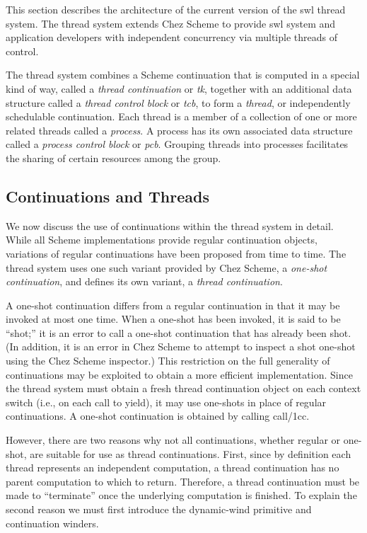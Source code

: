 \documentclass{article}
\begin{document}
This section describes the architecture of the current version of the
{\sc swl} thread system.  The thread system extends Chez Scheme to provide
{\sc swl} system and application developers with independent concurrency via
multiple threads of control. 

The thread system combines a Scheme continuation that is computed in a
special kind of way, called a {\em thread continuation\/} or {\em tk},
together with an additional data structure called a {\em thread
control block\/} or {\em tcb}, to form a {\em thread}, or
independently schedulable continuation.  Each thread is a member of a
collection of one or more related threads called a {\em process}. A
process has its own associated data structure called a {\em process
control block\/} or {\em pcb}. Grouping threads into processes
facilitates the sharing of certain resources among the group.



\subsection{Continuations and Threads}

We now discuss the use of continuations within the thread system in
detail.  While all Scheme implementations provide regular continuation
objects, variations of regular continuations have been proposed from
time to time.  The thread system uses one such variant provided by
Chez Scheme, a {\em one-shot continuation}, and defines its own
variant, a {\em thread continuation}.
 
A one-shot continuation differs from a regular continuation in that it
may be invoked at most one time.  When a one-shot has been invoked, it
is said to be ``shot;'' it is an error to call a one-shot continuation
that has already been shot. (In addition, it is an error in Chez
Scheme to attempt to inspect a shot one-shot using the Chez Scheme
inspector.)  This restriction on the full generality of continuations
may be exploited to obtain a more efficient implementation.  Since the
thread system must obtain a fresh thread continuation object on each
context switch (i.e., on each call to {\sf yield}), it may use
one-shots in place of regular continuations.  A one-shot continuation
is obtained by calling {\sf call/1cc}.

However, there are two reasons why not all continuations, whether
regular or one-shot, are suitable for use as thread continuations.
First, since by definition each thread represents an independent
computation, a thread continuation has no parent computation to which
to return.  Therefore, a thread continuation must be made to
``terminate'' once the underlying computation is finished.  To explain
the second reason we must first introduce the {\sf dynamic-wind}
primitive and continuation winders.
\end{document}
